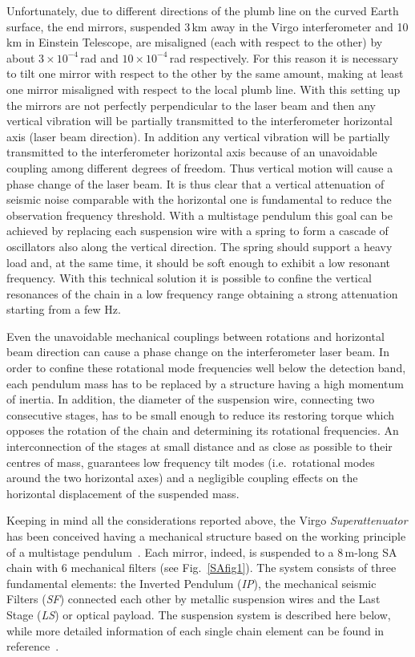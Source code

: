 Unfortunately, due to different directions of the plumb line on the curved Earth surface, the end mirrors, suspended 3\,km away in the Virgo interferometer and 10\,km in Einstein Telescope, are misaligned (each with respect to the other) by about $3\times 10^{-4}$\,rad and $10\times 10^{-4}$\,rad respectively. For this reason it is necessary to tilt one mirror with respect to the other by the same amount, making at least one mirror misaligned with respect to the local plumb line. With this setting up the mirrors are not perfectly perpendicular to the laser beam and then any vertical vibration will be partially transmitted to the interferometer horizontal axis (laser beam direction). In addition any vertical vibration will be partially transmitted to the interferometer horizontal axis because of an unavoidable coupling among different degrees of freedom. Thus vertical motion will cause a phase change of the laser beam. It is thus clear that a vertical attenuation of seismic noise comparable with the horizontal one is fundamental to reduce the observation frequency threshold. With a multistage pendulum this goal can be achieved by replacing each suspension wire with a spring to form a cascade of oscillators also along the vertical direction. The spring should support a heavy load and, at the same time, it should be soft enough to exhibit a low resonant frequency. With this technical solution it is possible to confine the vertical resonances of the chain in a low frequency range obtaining a strong attenuation starting from a few Hz. 

Even the unavoidable mechanical couplings between rotations and horizontal beam direction can cause a phase change on the interferometer laser beam. In order to confine these rotational mode frequencies well below the detection band, each pendulum mass has to be replaced by a structure having a high momentum of inertia. In addition, the diameter of the suspension wire, connecting two consecutive stages, has to be small enough to reduce its restoring torque which opposes the rotation of the chain and determining its rotational frequencies. An interconnection of the stages at small distance and as close as possible to their centres of mass, guarantees low frequency tilt modes (i.e.\ rotational modes around the two horizontal axes) and a negligible coupling effects on the horizontal displacement of the suspended mass.

Keeping in mind all the considerations reported above, the Virgo \emph{Superattenuator} has been conceived having a mechanical structure based on the working principle of a multistage pendulum~\cite{Ballardin2001}. Each mirror, indeed, is suspended to a 8\,m-long SA chain with 6 mechanical filters (see Fig.~\ref{SAfig1}). The system consists of three fundamental elements: the Inverted Pendulum (\emph{IP}), the mechanical seismic Filters (\emph{SF}) connected each other by metallic suspension wires and the Last Stage (\emph{LS}) or optical payload. The suspension system is described here below, while more detailed information of each single chain element can be found in reference~\cite{TheVirgoCollaboration1995}.

